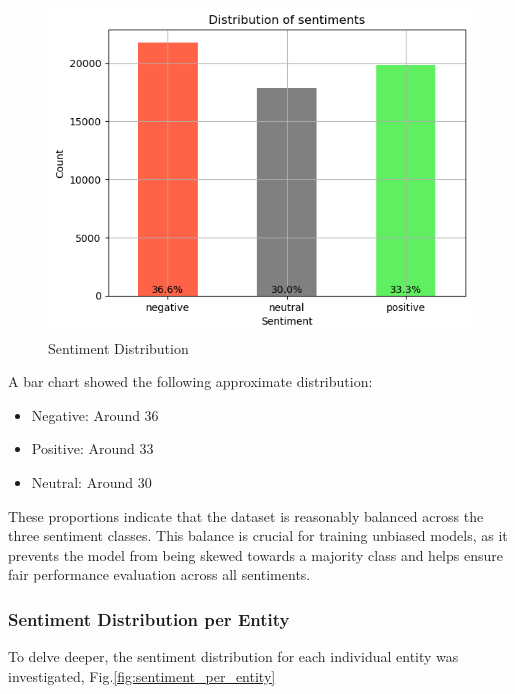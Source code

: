 \begin{figure}[H]
    \centering
    \includegraphics[width=1\linewidth]{images/sentiment_distribution.png}
    \caption{Sentiment Distribution}
    \label{fig:sentiment_distribution}
\end{figure}


A bar chart showed the following approximate distribution:

\begin{itemize}
    \item Negative: Around 36%
    \item Positive: Around 33%
    \item Neutral: Around 30%
\end{itemize}

These proportions indicate that the dataset is reasonably balanced across the three sentiment classes. This balance is crucial for training unbiased models, as it prevents the model from being skewed towards a majority class and helps ensure fair performance evaluation across all sentiments.


\subsubsection{Sentiment Distribution per Entity}

To delve deeper, the sentiment distribution for each individual entity was investigated, Fig.\ref{fig:sentiment_per_entity} 

